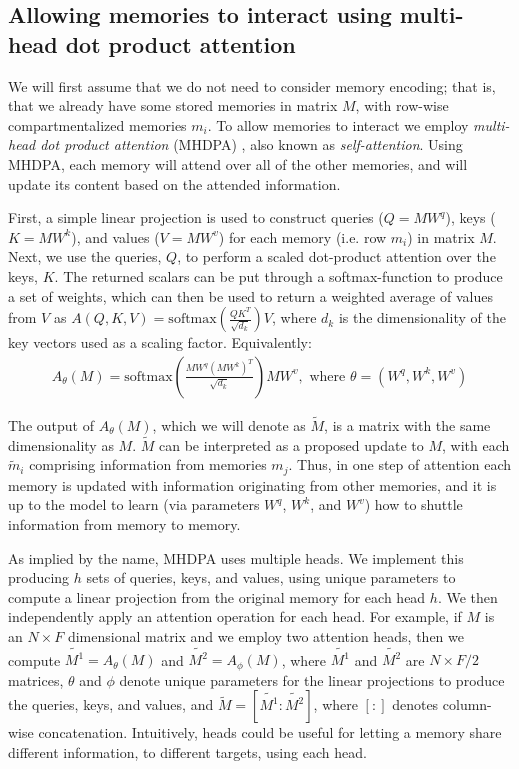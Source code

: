 \documentclass{article}
\begin{document}
\subsection{Allowing memories to interact using multi-head dot product attention}

We will first assume that we do not need to consider memory encoding; that is, that we already have some stored memories in matrix $M$, with row-wise compartmentalized memories $m_i$. To allow memories to interact we employ \textit{multi-head dot product attention} (MHDPA) \citep{vaswani2017attention}, also known as \textit{self-attention}. Using MHDPA, each memory will attend over all of the other memories, and will update its content based on the attended information.

First, a simple linear projection is used to construct queries ($Q = MW^q$), keys ($K = MW^k$), and values ($V = MW^v$) for each memory (i.e. row $m_i$) in matrix $M$. Next, we use the queries, $Q$, to perform a scaled dot-product attention over the keys, $K$. The returned scalars can be put through a softmax-function to produce a set of weights, which can then be used to return a weighted average of values from $V$ as $A(Q, K, V) = \text{softmax} \left( \frac{QK^T}{\sqrt{d_k}} \right) V $, where $d_k$ is the dimensionality of the key vectors used as a scaling factor. Equivalently:
\begin{align}
    A_{\theta}(M) = \text{softmax} \left( \frac{MW^q(MW^k)^T}{\sqrt{d_k}} \right) MW^v \label{eq:attention}, \text{ where } \theta=(W^q, W^k, W^v)
\end{align}

The output of $A_{\theta}(M)$, which we will denote as $\widetilde{M}$, is a matrix with the same dimensionality as $M$. $\widetilde{M}$ can be interpreted as a proposed update to $M$, with each $\widetilde{m}_i$ comprising information from memories $m_{j}$. Thus, in one step of attention each memory is updated with information originating from other memories, and it is up to the model to learn (via parameters $W^q$, $W^k$, and $W^v$) how to shuttle information from memory to memory.

As implied by the name, MHDPA uses multiple heads. We implement this producing $h$ sets of queries, keys, and values, using unique parameters to compute a linear projection from the original memory for each head $h$. We then independently apply an attention operation for each head. For example, if $M$ is an $N \times F$ dimensional matrix and we employ two attention heads, then we compute $\widetilde{M^1} = A_{\theta}(M)$ and $\widetilde{M^2} = A_{\phi}(M)$, where $\widetilde{M^1}$ and $\widetilde{M^2}$ are $N \times F/2$ matrices, $\theta$ and $\phi$ denote unique parameters for the linear projections to produce the queries, keys, and values, and $\widetilde{M} = [\widetilde{M^1}: \widetilde{M^2}]$, where $[:]$ denotes column-wise concatenation. Intuitively, heads could be useful for letting a memory share different information, to different targets, using each head.
\end{document}
